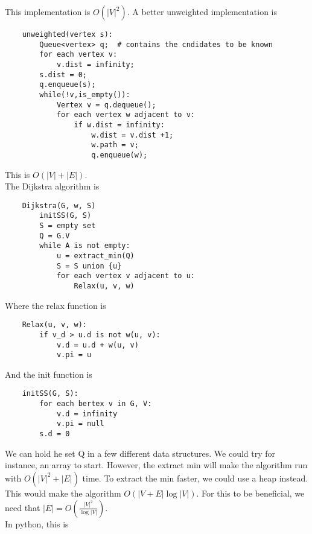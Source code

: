 \documentclass[]{article}
\begin{document}
This implementation is $O(|V|^2)$. A better unweighted implementation is

\begin{lstlisting}
	unweighted(vertex s):
		Queue<vertex> q;  # contains the cndidates to be known
		for each vertex v:
			v.dist = infinity;
		s.dist = 0;
		q.enqueue(s);
		while(!v,is_empty()):
			Vertex v = q.dequeue();
			for each vertex w adjacent to v:
				if w.dist = infinity:
					w.dist = v.dist +1;
					w.path = v;
					q.enqueue(w);
\end{lstlisting}\bigbreak

This is $O(|V|+|E|)$.\\


The Dijkstra algorithm is

\begin{lstlisting}
	Dijkstra(G, w, S)
		initSS(G, S)
		S = empty set
		Q = G.V
		while A is not empty:
			u = extract_min(Q)
			S = S union {u}
			for each vertex v adjacent to u: 
				Relax(u, v, w)
\end{lstlisting}\bigbreak

Where the relax function is 

\begin{lstlisting}
	Relax(u, v, w):
		if v_d > u.d is not w(u, v):
			v.d = u.d + w(u, v)
			v.pi = u
\end{lstlisting}\bigbreak

And the init function is

\begin{lstlisting}
	initSS(G, S):
		for each bertex v in G, V:
			v.d = infinity
			v.pi = null
		s.d = 0
\end{lstlisting}\bigbreak

We can hold he set Q in a few different data structures. We could try for instance, an array to start. However, the extract min will make the algorithm run with $O(|V|^2 + |E|)$ time. To extract the min faster, we could use a heap instead. This would make the algorithm $O(|V + E|\log |V|)$. For this to be beneficial, we need that $|E| = O(\frac{|V|^2}{\log |V|})$.\\

In python, this is
\end{document}
